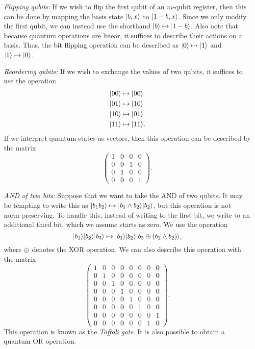 \documentclass[12pt]{article}
\begin{document}
\begin{adjustwidth}{0.25in}{0in}
  \emph{Flipping qubits:} If we wish to flip the first qubit of an $m$-qubit
  register, then this can be done by mapping the basis state $\reg*{b, x}$ to
  $\reg*{1-b, x}$. Since we only modify the first qubit, we can instead use the
  shorthand $\reg*{b} \mapsto \reg*{1-b}$. Also note that because quantum
  operations are linear, it suffices to describe their actions on a basis. Thus,
  the bit flipping operation can be described as $\qz \mapsto \qo$ and $\qo
  \mapsto \qz$. \vspace{0.5\baselineskip}

  \noindent \emph{Reordering qubits:} If we wish to exchange the values of two
  qubits, it suffices to use the operation
  \begin{align*}
    \reg*{00} &\mapsto \reg*{00} \\
    \reg*{01} &\mapsto \reg*{10} \\
    \reg*{10} &\mapsto \reg*{01} \\
    \reg*{11} &\mapsto \reg*{11}.
  \end{align*}
  If we interpret quantum states as vectors, then this operation can be
  described by the matrix
  $$
    \begin{pmatrix}
      1 & 0 & 0 & 0 \\
      0 & 0 & 1 & 0 \\
      0 & 1 & 0 & 0 \\
      0 & 0 & 0 & 1
    \end{pmatrix}.
  $$ \vspace{0.5\baselineskip}

  \noindent \emph{AND of two bits:} Suppose that we want to take the AND of two
  qubits. It may be tempting to write this as $\reg*{b_1b_2} \mapsto \reg*{b_1
  \land b_2}\reg*{b_2}$, but this operation is not norm-preserving. To handle
  this, instead of writing to the first bit, we write to an additional third
  bit, which we assume starts as zero. We use the operation
  $$
    \reg*{b_1}\reg*{b_2}\reg*{b_3} \mapsto \reg*{b_1}\reg*{b_2}\reg*{b_3 \xor
    (b_1 \land b_2)},
  $$
  where $\xor$ denotes the XOR operation. We can also describe this operation
  with the matrix
  $$
    \begin{pmatrix}
      1 & 0 & 0 & 0 & 0 & 0 & 0 & 0 \\
      0 & 1 & 0 & 0 & 0 & 0 & 0 & 0 \\
      0 & 0 & 1 & 0 & 0 & 0 & 0 & 0 \\
      0 & 0 & 0 & 1 & 0 & 0 & 0 & 0 \\
      0 & 0 & 0 & 0 & 1 & 0 & 0 & 0 \\
      0 & 0 & 0 & 0 & 0 & 1 & 0 & 0 \\
      0 & 0 & 0 & 0 & 0 & 0 & 0 & 1 \\
      0 & 0 & 0 & 0 & 0 & 0 & 1 & 0
    \end{pmatrix}.
  $$
  This operation is known as the \emph{Toffoli gate}. It is also possible to
  obtain a quantum OR operation. \vspace{0.5\baselineskip}


\end{adjustwidth}
\end{document}
